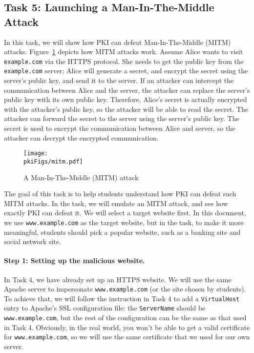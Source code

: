 \subsection{Task 5: Launching a Man-In-The-Middle Attack}

In this task, we will show how PKI can defeat Man-In-The-Middle (MITM) attacks. 
Figure~\ref{pki:fig:mitm} depicts how MITM attacks work. 
Assume Alice wants to visit \texttt{example.com} via the HTTPS protocol. She 
needs to get the public key from the \texttt{example.com} server; Alice will 
generate a secret, and encrypt the secret using the server's public key,
and send it to the server. 
If an attacker can
intercept the communication between Alice and the server, the attacker 
can replace the server's public key with its own public key. Therefore, Alice's secret is
actually encrypted with the attacker's public key, so the attacker
will be able to read the secret. The attacker can forward the secret to the server using the
server's public key. The secret is used to encrypt the communication between Alice and server,  
so the attacker can decrypt the encrypted communication. 


\begin{figure}[htb]
   \begin{center}
      \texttt{[image: \\pkiFigs/mitm.pdf]}
   \end{center}
   \caption{A Man-In-The-Middle (MITM) attack}
   \label{pki:fig:mitm}
\end{figure}



The goal of this task is to help students understand how PKI can defeat such MITM attacks. 
In the task, we will emulate an MITM attack, and see how exactly PKI can defeat it.
We will select a target website first. In this document, we use 
\texttt{www.example.com} as the target website, but in the task, to make it more meaningful,
students should pick a popular website, such as a banking site and social network site. 


\paragraph{Step 1: Setting up the malicious website.} 
In Task 4, we have already set up an HTTPS website. We will
use the same Apache server to impersonate \texttt{www.example.com} (or the site chosen by students).  
To achieve that, we will follow the instruction in Task 4 to 
add a \texttt{VirtualHost} entry to Apache's SSL configuration file: the
\texttt{ServerName} should be \texttt{www.example.com}, but the rest of the
configuration can be the same as that used in Task 4. Obviously, in the real world,
you won't be able to get a valid certificate for \texttt{www.example.com}, 
so we will use the same certificate that we used for our own server. 


